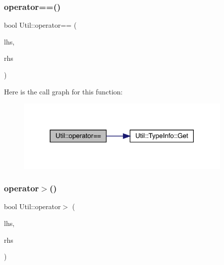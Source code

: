 \mbox{\label{namespaceUtil_a2d346e60a99268ba998a5a2daf20ab12}} 
\subsubsection{\texorpdfstring{operator==()}{operator==()}}
{\footnotesize\ttfamily bool Util\+::operator== (\begin{DoxyParamCaption}\item[{const \mbox{\hyperlink{classUtil_1_1TypeInfo}{Type\+Info}} \&}]{lhs,  }\item[{const \mbox{\hyperlink{classUtil_1_1TypeInfo}{Type\+Info}} \&}]{rhs }\end{DoxyParamCaption})\hspace{0.3cm}{\ttfamily [inline]}}

Here is the call graph for this function\+:\nopagebreak
\begin{figure}[H]
\begin{center}
\leavevmode
\includegraphics[width=297pt]{d2/daf/namespaceUtil_a2d346e60a99268ba998a5a2daf20ab12_cgraph}
\end{center}
\end{figure}
\mbox{\label{namespaceUtil_aa36c7338b4d071f888e50c951d0594f4}} 
\subsubsection{\texorpdfstring{operator$>$()}{operator>()}}
{\footnotesize\ttfamily bool Util\+::operator$>$ (\begin{DoxyParamCaption}\item[{const \mbox{\hyperlink{classUtil_1_1TypeInfo}{Type\+Info}} \&}]{lhs,  }\item[{const \mbox{\hyperlink{classUtil_1_1TypeInfo}{Type\+Info}} \&}]{rhs }\end{DoxyParamCaption})\hspace{0.3cm}{\ttfamily [inline]}}

